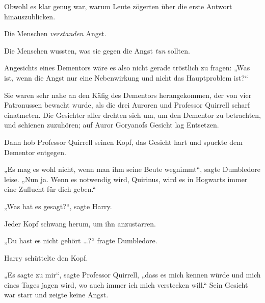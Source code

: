 Obwohl es klar genug war, warum Leute zögerten über die erste Antwort hinauszublicken.

Die Menschen \emph{verstanden} Angst.

Die Menschen wussten, was sie gegen die Angst \emph{tun} sollten.

Angesichts eines Dementors wäre es also nicht gerade tröstlich zu fragen:
„Was ist, wenn die Angst nur eine Nebenwirkung und nicht das Hauptproblem ist?“

Sie waren sehr nahe an den Käfig des Dementors herangekommen, der von vier Patronussen bewacht wurde, als die drei Auroren und Professor Quirrell scharf einatmeten. Die Gesichter aller drehten sich um, um den Dementor zu betrachten, und schienen zuzuhören; auf Auror Goryanofs Gesicht lag Entsetzen.

Dann hob Professor Quirrell seinen Kopf, das Gesicht hart und spuckte dem Dementor entgegen.

„Es mag es wohl nicht, wenn man ihm seine Beute wegnimmt“, sagte Dumbledore leise.
„Nun ja. Wenn es notwendig wird, Quirinus, wird es in Hogwarts immer eine Zuflucht für dich geben.“

„Was hat es gesagt?“, sagte Harry.

Jeder Kopf schwang herum, um ihn anzustarren.

„Du hast es nicht gehört …?“ fragte Dumbledore.

Harry schüttelte den Kopf.

„Es sagte zu mir“, sagte Professor Quirrell, „dass es mich kennen würde und mich eines Tages jagen wird, wo auch immer ich mich verstecken will.“ Sein Gesicht war starr und zeigte keine Angst.

